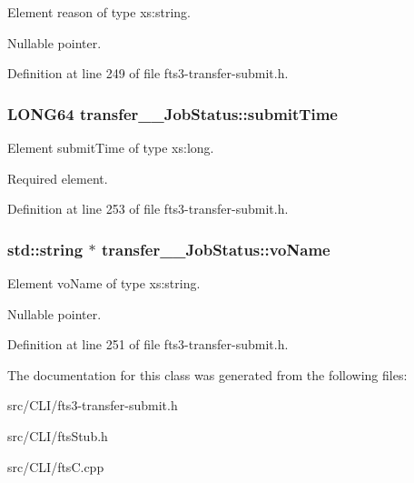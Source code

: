 Element reason of type xs:string. 

Nullable pointer. 

Definition at line 249 of file fts3-\/transfer-\/submit.h.

\subsubsection[{submitTime}]{\setlength{\rightskip}{0pt plus 5cm}LONG64 {\bf transfer\_\-\_\-JobStatus::submitTime}}\label{classtransfer____JobStatus_a335aedfcdd9f3cc3fbf7eca50f9a246e}


Element submitTime of type xs:long. 

Required element. 

Definition at line 253 of file fts3-\/transfer-\/submit.h.

\subsubsection[{voName}]{\setlength{\rightskip}{0pt plus 5cm}std::string $\ast$ {\bf transfer\_\-\_\-JobStatus::voName}}\label{classtransfer____JobStatus_ada3a67df82deaa29e7cf200e9d9615fe}


Element voName of type xs:string. 

Nullable pointer. 

Definition at line 251 of file fts3-\/transfer-\/submit.h.



The documentation for this class was generated from the following files:\begin{DoxyCompactItemize}
\item 
src/CLI/fts3-\/transfer-\/submit.h\item 
src/CLI/ftsStub.h\item 
src/CLI/ftsC.cpp\end{DoxyCompactItemize}
